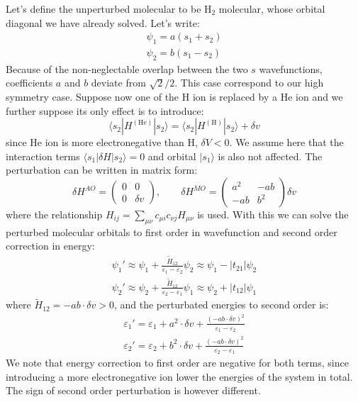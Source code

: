 \documentclass{article}
\newcommand{\statebra}[1]{\langle #1 |}
\newcommand{\stateket}[1]{| #1 \rangle}
\begin{document}
Let's define the unperturbed molecular to be H$_2$ molecular, whose orbital diagonal we 
have already solved. Let's write:
\begin{align*}
    \psi_1 = a (s_1 + s_2) \\ 
    \psi_2 = b (s_1 - s_2)
\end{align*}
Because of the non-neglectable overlap between the two $s$ wavefunctions, coefficients $a$ and $b$
deviate from $\sqrt{2}/2$. 
This case correspond to our high symmetry case. Suppose now one of the 
H ion is replaced by a He ion and we further suppose its only effect is to introduce:
\begin{equation*}
    \statebra{s_2} H^{(\text{He})} \stateket{s_2} = \statebra{s_2} H^{(\text{H})} \stateket{s_2} + \delta v
\end{equation*}
since He ion is more electronegative than H, $\delta V < 0$. We assume here that the interaction 
terms $\statebra{s_1} \delta H \stateket{s_2} = 0$ and orbital $\stateket{s_1}$ is also not affected. The perturbation 
can be written in matrix form:
\begin{equation*}
    \delta H^{AO} = \left(\begin{matrix}
        0 & 0 \\ 0 & \delta v
    \end{matrix}\right), \qquad 
    \delta H^{MO} = \left(\begin{matrix}
        a^2 & -ab  \\ -ab  & b^2
    \end{matrix}\right) \delta v
\end{equation*}
where the relationship $H_{ij} = \sum_{\mu \nu} c_{\mu i} c_{\nu j} H_{\mu \nu}$ is used. With this we can solve 
the perturbed molecular orbitals to first order in wavefunction and second order correction in energy:
\begin{align*}
    \psi_1' \approx \psi_1 + \frac{\tilde{H}_{12}}{\varepsilon_1 - \varepsilon_2} \psi_2 \approx \psi_1 - |t_{21}| \psi_2 \\ 
    \psi_2' \approx \psi_2 + \frac{\tilde{H}_{12}}{\varepsilon_2 - \varepsilon_1} \psi_1 \approx \psi_2 + |t_{12}| \psi_1
\end{align*}
where $\tilde{H}_{12} = -ab\cdot \delta v > 0$, and the perturbated energies to second order is:
\begin{align*}
    \varepsilon_1' = \varepsilon_1 + a^2 \cdot \delta v + \frac{(-ab\cdot \delta v)^2}{\varepsilon_1 - \varepsilon_2} \\ 
    \varepsilon_2' = \varepsilon_2 + b^2 \cdot \delta v + \frac{(-ab\cdot \delta v)^2}{\varepsilon_2 - \varepsilon_1} 
\end{align*}
We note that energy correction to first order are negative for both terms, since introducing a more electronegative ion 
lower the energies of the system in total. The sign of second order perturbation is however different.
\end{document}
